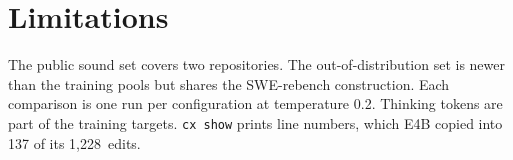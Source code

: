 \section{Limitations}\label{sec:limits}

The public sound set covers two repositories. The out-of-distribution set is newer than the training pools but shares the SWE-rebench construction. Each comparison is one run per configuration at temperature 0.2. Thinking tokens are part of the training targets. \texttt{cx show} prints line numbers, which E4B copied into 137 of its 1,228~edits.
